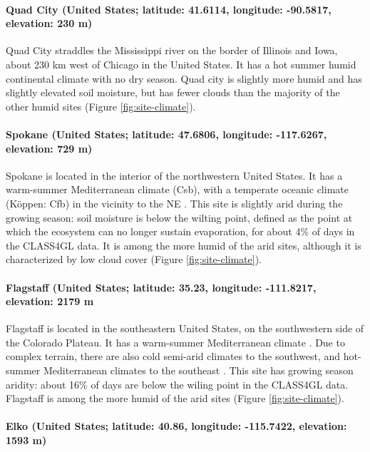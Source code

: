 \paragraph{Quad City (United States; latitude: 41.6114, longitude:
  -90.5817, elevation: 230 m)}

Quad City straddles the Mississippi river on the border of Illinois
and Iowa, about 230 km west of Chicago in the United States. It has a
hot summer humid continental climate \cite[K\"{o}ppen:
  Dfa][]{rubel2010} with no dry season. Quad city is slightly more
humid and has slightly elevated soil moisture, but has fewer clouds
than the majority of the other humid sites (Figure \ref{fig:site-climate}).

\paragraph{Spokane (United States; latitude: 47.6806, longitude:
  -117.6267, elevation: 729 m)}

Spokane is located in the interior of the northwestern United
States. It has a warm-summer Mediterranean climate (Csb), with a
temperate oceanic climate (K\"{o}ppen: Cfb) in the vicinity to the NE
\cite{rubel2010}. This site is slightly arid during the growing
season: soil moisture is below the wilting point, defined as the
point at which the ecosystem can no longer sustain evaporation, for
about 4\% of days in the CLASS4GL data. It is among the more humid of
the arid sites, although it is characterized by low cloud cover
(Figure \ref{fig:site-climate}).

\paragraph{Flagstaff (United States; latitude: 35.23, longitude: -111.8217, elevation: 2179 m}

Flagstaff is located in the southeastern United States, on the
southwestern side of the Colorado Plateau. It has a warm-summer
Mediterranean climate \cite[K\"{o}ppen: Csb,][]{rubel2010}. Due to
complex terrain, there are also cold semi-arid climates
\cite[K\"{o}ppen: BSk,][]{rubel2010} to the southwest, and hot-summer
Mediterranean climates to the southeast \cite[K\"{o}ppen:
  Csa,][]{rubel2010}. This site has growing season aridity: about 16\%
of days are below the wiling point in the CLASS4GL data. Flagstaff is
among the more humid of the arid sites (Figure \ref{fig:site-climate}).

\paragraph{Elko (United States; latitude: 40.86, longitude: -115.7422,
  elevation: 1593 m)}


